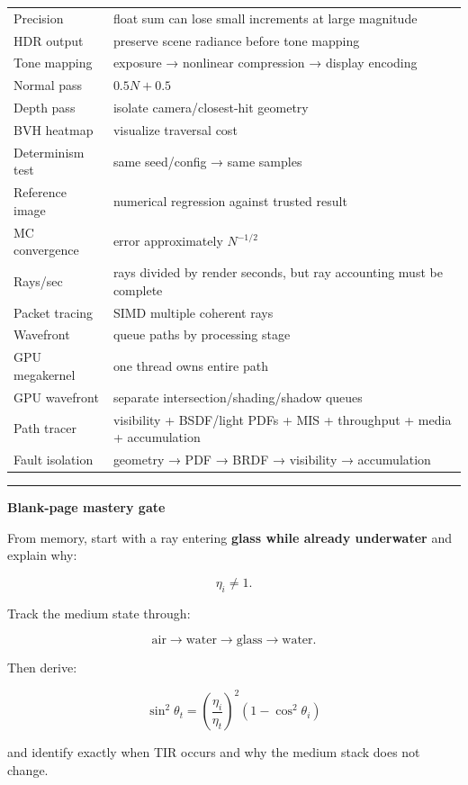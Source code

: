 {\begin{longtable}[]{@{}
  >{\raggedright\arraybackslash}p{}
  >{\raggedright\arraybackslash}p{}@{}}
Precision & float sum can lose small increments at large magnitude \\
HDR output & preserve scene radiance before tone mapping \\
Tone mapping & exposure → nonlinear compression → display encoding \\
Normal pass & \(0.5N+0.5\) \\
Depth pass & isolate camera/closest-hit geometry \\
BVH heatmap & visualize traversal cost \\
Determinism test & same seed/config → same samples \\
Reference image & numerical regression against trusted result \\
MC convergence & error approximately \(N^{-1/2}\) \\
Rays/sec & rays divided by render seconds, but ray accounting must be complete \\
Packet tracing & SIMD multiple coherent rays \\
Wavefront & queue paths by processing stage \\
GPU megakernel & one thread owns entire path \\
GPU wavefront & separate intersection/shading/shadow queues \\
Path tracer & visibility + BSDF/light PDFs + MIS + throughput + media + accumulation \\
Fault isolation & geometry → PDF → BRDF → visibility → accumulation \\
\end{longtable}
}

\begin{center}\rule{0.5\linewidth}{0.5pt}\end{center}

\textbf{Blank-page mastery gate}

From memory, start with a ray entering \textbf{glass while already underwater} and explain why:

\[
\eta_i\neq1.
\]

Track the medium state through:

\[
\text{air}
\rightarrow
\text{water}
\rightarrow
\text{glass}
\rightarrow
\text{water}.
\]

Then derive:

\[
\sin^2\theta_t
=
\left(
\frac{\eta_i}{\eta_t}
\right)^2
(
1-\cos^2\theta_i
)
\]

and identify exactly when TIR occurs and why the medium stack does not change.

